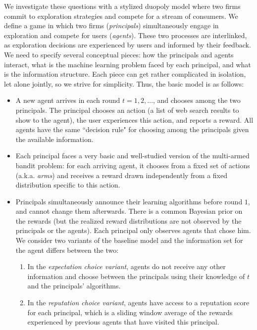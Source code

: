 


 We investigate these questions with a stylized duopoly model where two firms commit to exploration strategies and compete for a stream of consumers. We define a game in which two firms (\emph{principals}) simultaneously engage in exploration and compete for users (\emph{agents}). These two processes are interlinked, as exploration decisions are experienced by users and informed by their feedback. We need to specify several conceptual pieces: how the principals and agents interact, what is the machine learning problem faced by each principal, and what is the information structure. Each piece can get rather complicated in isolation, let alone jointly, so we strive for simplicity. Thus, the basic model is as follows:

\begin{itemize}

\item A new agent arrives in each round $t=1,2, \ldots$, and chooses among the two principals. The principal chooses an action (\eg a list of web search results to show to the agent), the user experiences this action, and reports a reward. All agents have the same ``decision rule" for choosing among the principals given the available information.

\item Each principal faces a very basic and well-studied version of the multi-armed bandit problem: for each arriving agent, it chooses from a fixed set of actions  (a.k.a. \emph{arms}) and receives a reward drawn independently from a fixed distribution specific to this action.

\item Principals simultaneously announce their learning algorithms before round $1$, and cannot change them afterwards. There is a common Bayesian prior on the rewards (but the realized reward distributions are not observed by the principals or the agents).  Each principal only observes agents that chose him. We consider two variants of the baseline model and the information set for the agent differs between the two:
\begin{enumerate}
\item In the \textit{expectation choice variant}, agents do not receive any other information and choose between the principals using their knowledge of $t$ and the principals' algorithms.
\item In the \textit{reputation choice variant}, agents have access to a reputation score for each principal, which is a sliding window average of the rewards experienced by previous agents that have visited this principal.
\end{enumerate}
\end{itemize}

